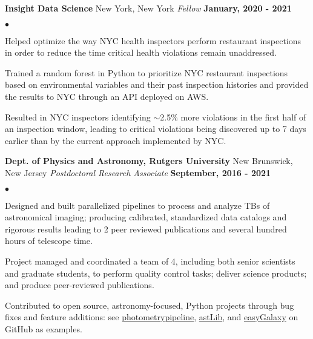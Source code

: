 \documentclass[margin,line, 11pt]{res}
\newenvironment{list2}{
  \begin{list}{$\bullet$}{%
      \setlength{\itemsep}{0in}
      \setlength{\parsep}{0in} \setlength{\parskip}{0in}
      \setlength{\topsep}{0in} \setlength{\partopsep}{0in}
      \setlength{\leftmargin}{0.2in}}}{\end{list}}
\begin{document}
\begin{resume}
\textbf{Insight Data Science} \hfill New York, New York\newline
\textit{Fellow} \hfill \textbf{January, 2020 - 2021}\newline
    \begin{list2}
    	\vspace*{-5mm}
      \item Helped optimize the way NYC health inspectors perform restaurant inspections in order to reduce the time critical health violations remain unaddressed.
    	\item Trained a random forest in Python to prioritize NYC restaurant inspections based on environmental variables and their past inspection histories and provided the results to NYC through an API deployed on AWS.
    	\item Resulted in NYC inspectors identifying $\sim$2.5\% more violations in the first half of an inspection window,  leading to critical violations being discovered up to 7 days earlier than by the current approach implemented by NYC.
    \end{list2}

\textbf{Dept. of Physics and Astronomy, Rutgers University} \hfill New Brunswick, New Jersey\newline
\textit{Postdoctoral Research Associate} \hfill \textbf{September, 2016 - 2021}\newline
    \begin{list2}
    	\vspace*{-5mm}
    	\item Designed and built parallelized pipelines to process and analyze TBs of astronomical imaging; producing calibrated, standardized data catalogs and rigorous results leading to 2 peer reviewed publications and several hundred hours of telescope time.
    	\item Project managed and coordinated a team of 4, including both senior scientists and graduate students,
      to perform quality control tasks; deliver science products; and produce peer-reviewed publications.
    	\item Contributed to open source, astronomy-focused, Python projects through bug fixes and feature additions: see \href{https://github.com/boada/photometrypipeline}{photometrypipeline}, \href{http://astlib.sourceforge.net/}{astLib}, and \href{https://github.com/boada/easyGalaxy}{easyGalaxy} on GitHub as examples.
    \end{list2}


\end{resume}
\end{document}
